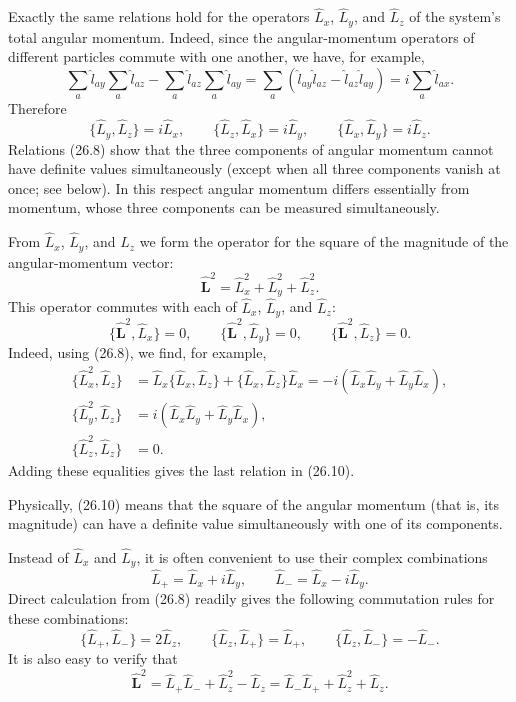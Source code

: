 Exactly the same relations hold for the operators
$\hat L_x$, $\hat L_y$, and $\hat L_z$ of the system's total angular
momentum. Indeed, since the angular-momentum operators of different particles
commute with one another, we have, for example,
\[
  \sum_a\hat l_{ay}\sum_a\hat l_{az}
  -\sum_a\hat l_{az}\sum_a\hat l_{ay}
  =\sum_a(\hat l_{ay}\hat l_{az}-\hat l_{az}\hat l_{ay})
  =i\sum_a\hat l_{ax}.
\]
Therefore
\begin{equation}
  \{\hat L_y,\hat L_z\}=i\hat L_x,\qquad
  \{\hat L_z,\hat L_x\}=i\hat L_y,\qquad
  \{\hat L_x,\hat L_y\}=i\hat L_z.
  \tag{26.8}
\end{equation}
Relations (26.8) show that the three components of angular momentum cannot
have definite values simultaneously (except when all three components vanish
at once; see below). In this respect angular momentum differs essentially
from momentum, whose three components can be measured simultaneously.

From $\hat L_x$, $\hat L_y$, and $\hat L_z$ we form the operator for the square
of the magnitude of the angular-momentum vector:
\begin{equation}
  \hat{\mathbf L}^{2}=\hat L_x^2+\hat L_y^2+\hat L_z^2.
  \tag{26.9}
\end{equation}
This operator commutes with each of $\hat L_x$, $\hat L_y$, and $\hat L_z$:
\begin{equation}
  \{\hat{\mathbf L}^{2},\hat L_x\}=0,\qquad
  \{\hat{\mathbf L}^{2},\hat L_y\}=0,\qquad
  \{\hat{\mathbf L}^{2},\hat L_z\}=0.
  \tag{26.10}
\end{equation}
Indeed, using (26.8), we find, for example,
\[
  \begin{aligned}
  \{\hat L_x^2,\hat L_z\}
    &=\hat L_x\{\hat L_x,\hat L_z\}
      +\{\hat L_x,\hat L_z\}\hat L_x
      =-i(\hat L_x\hat L_y+\hat L_y\hat L_x),\\
  \{\hat L_y^2,\hat L_z\}
    &=i(\hat L_x\hat L_y+\hat L_y\hat L_x),\\
  \{\hat L_z^2,\hat L_z\}&=0.
  \end{aligned}
\]
Adding these equalities gives the last relation in (26.10).

Physically, (26.10) means that the square of the angular momentum (that is,
its magnitude) can have a definite value simultaneously with one of its
components.

Instead of $\hat L_x$ and $\hat L_y$, it is often convenient to use their
complex combinations
\begin{equation}
  \hat L_+=\hat L_x+i\hat L_y,\qquad
  \hat L_-=\hat L_x-i\hat L_y.
  \tag{26.11}
\end{equation}
Direct calculation from (26.8) readily gives the following commutation rules
for these combinations:
\begin{equation}
  \{\hat L_+,\hat L_-\}=2\hat L_z,\qquad
  \{\hat L_z,\hat L_+\}=\hat L_+,
  \qquad \{\hat L_z,\hat L_-\}=-\hat L_-.
  \tag{26.12}
\end{equation}
It is also easy to verify that
\begin{equation}
  \hat{\mathbf L}^{2}
  =\hat L_+\hat L_-+\hat L_z^2-\hat L_z
  =\hat L_-\hat L_++\hat L_z^2+\hat L_z.
  \tag{26.13}
\end{equation}

